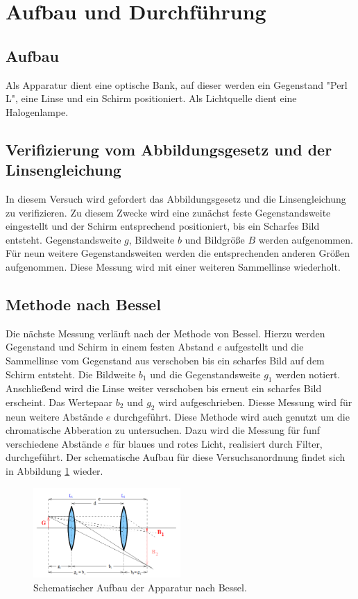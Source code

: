 \newpage
\section{Aufbau und Durchführung}
\label{sec:Durchführung}
\subsection{Aufbau}
Als Apparatur dient eine optische Bank, auf dieser werden ein Gegenstand "Perl L", eine Linse und ein Schirm
positioniert. Als Lichtquelle dient eine Halogenlampe.
\subsection{Verifizierung vom Abbildungsgesetz und der Linsengleichung}
In diesem Versuch wird gefordert das Abbildungsgesetz und die Linsengleichung zu verifizieren.
Zu diesem Zwecke wird eine zunächst feste Gegenstandsweite eingestellt und der Schirm entsprechend
positioniert, bis ein Scharfes Bild entsteht. Gegenstandsweite $g$, Bildweite $b$ und Bildgröße $B$ werden
aufgenommen. Für neun weitere Gegenstandsweiten werden die entsprechenden anderen Größen aufgenommen.
Diese Messung wird mit einer weiteren Sammellinse wiederholt.
\subsection{Methode nach Bessel}
Die nächste Messung verläuft nach der Methode von Bessel. Hierzu werden Gegenstand und Schirm
in einem festen Abstand $e$ aufgestellt und die Sammellinse vom Gegenstand aus verschoben bis ein scharfes Bild
auf dem Schirm entsteht. Die Bildweite $b_\mathrm{1}$ und die Gegenstandsweite $g_\mathrm{1}$ werden
notiert. Anschließend wird die Linse weiter verschoben bis erneut ein scharfes Bild erscheint.
Das Wertepaar $b_\mathrm{2}$ und $g_\mathrm{2}$ wird aufgeschrieben. Diesse Messung wird für neun
weitere Abstände $e$ durchgeführt.
Diese Methode wird auch genutzt um die chromatische Abberation zu untersuchen. Dazu wird die Messung
für funf verschiedene Abstände $e$ für blaues und rotes Licht, realisiert durch Filter, durchgeführt.
Der schematische Aufbau für diese Versuchsanordnung findet sich in Abbildung \ref{fig:bessel} wieder.
\begin{figure}
 \centering
 \includegraphics[width=0.5\textwidth]{bessel.png}
 \caption{Schematischer Aufbau der Apparatur nach Bessel\cite{sample}.}
 \label{fig:bessel}
 \end{figure}
 \newpage
